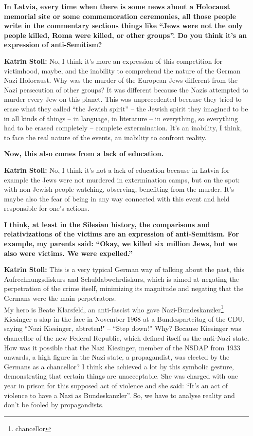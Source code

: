 \textbf{In Latvia, every time when there is some news about a Holocaust memorial site or some commemoration ceremonies, all those people write in the commentary sections things like ``Jews were not the only people killed, Roma were killed, or other groups''. Do you think it’s an expression of anti-Semitism?} 

\textbf{Katrin Stoll:} No, I think it’s more an expression of this competition for victimhood, maybe, and the inability to comprehend the nature of the German Nazi Holocaust. Why was the murder of the European Jews different from the Nazi persecution of other groups? It was different because the Nazis attempted to murder every Jew on this planet. This was unprecedented because they tried to erase what they called ``the Jewish spirit'' – the Jewish spirit they imagined to be in all kinds of things – in language, in literature – in everything, so everything had to be erased completely – complete extermination. It’s an inability, I think, to face the real nature of the events, an inability to confront reality. 

\textbf{Now, this also comes from a lack of education.} 

\textbf{Katrin Stoll:} No, I think it’s not a lack of education because in Latvia for example the Jews were not murdered in extermination camps, but on the spot: with non-Jewish people watching, observing, benefiting from the murder. It’s maybe also the fear of being in any way connected with this event and held responsible for one’s actions. 

\textbf{I think, at least in the Silesian history, the comparisons and relativizations of the victims are an expression of anti-Semitism. For example, my parents said: ``Okay, we killed six million Jews, but we also were victims. We were expelled.''}  

\textbf{Katrin Stoll:} This is a very typical German way of talking about the past, this Aufrechnungsdiskurs and Schuldabwehrdiskurs, which is aimed at negating the perpetration of the crime itself, minimizing its magnitude and negating that the Germans were the main perpetrators.\\
My hero is Beate Klarsfeld, an anti-fascist who gave Nazi-Bundeskanzler\footnote{chancellor} Kiesinger a slap in the face in November 1968 at a Bundesparteitag of the CDU, saying ``Nazi Kiesinger, abtreten!" – ``Step down!'' Why? Because Kiesinger was chancellor of the new Federal Republic, which defined itself as the anti-Nazi state. How was it possible that the Nazi Kiesinger, member of the NSDAP from 1933 onwards, a high figure in the Nazi state, a propagandist, was elected by the Germans as a chancellor? I think she achieved a lot by this symbolic gesture, demonstrating that certain things are unacceptable. She was charged with one year in prison for this supposed act of violence and she said: ``It’s an act of violence to have a Nazi as Bundeskanzler''. So, we have to analyse reality and don’t be fooled by propagandists.  